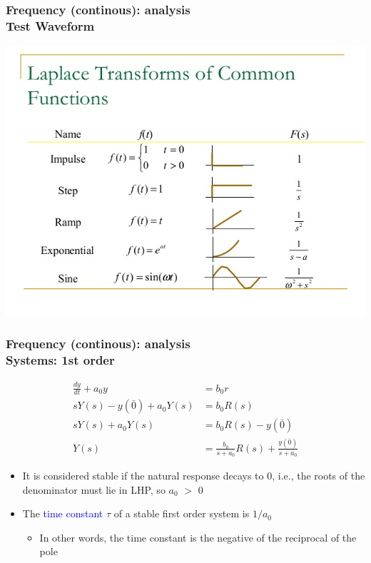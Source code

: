 \documentclass[hyperref={pdfpagelabels=true}]{beamer}
\begin{document}
\begin{frame}
\frametitle{Frequency (continous): analysis\\ {\large Test Waveform}}
\includegraphics[scale = 0.46]{figs/Selection_024.jpg}\\
\end{frame}

\begin{frame}
\frametitle{Frequency (continous): analysis \\ {\large Systems: 1st order}}
\begin{align*}
\frac{dy}{dt}+a_0y&=b_0r \\
sY(s)-y(\bar{0})+a_0Y(s)&=b_0R(s) \\
sY(s)+a_0Y(s)&=b_0R(s)-y(\bar{0}) \\
Y(s) &= \frac{b_0}{s+a_0}R(s)+\frac{y(\bar{0})}{s+a_0}
\end{align*}

\begin{itemize}
\item It is considered stable if the natural response
decays to 0, i.e., the roots of the denominator
must lie in LHP, so $a_0$ $>$ 0
\item The \textcolor{blue}{time constant} $\tau$ of a stable first order system
is $1/a_0$
\begin{itemize}
\item In other words, the time constant is the negative
of the reciprocal of the pole
\end{itemize}
\end{itemize}

\end{frame}
\end{document}
